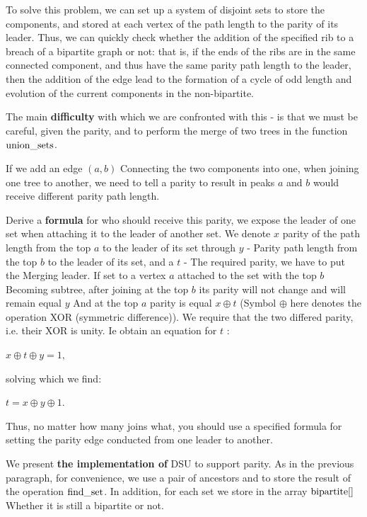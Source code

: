To solve this problem, we can set up a system of disjoint sets to store the components, and stored at each vertex of the path length to the parity of its leader. Thus, we can quickly check whether the addition of the specified rib to a breach of a bipartite graph or not: that is, if the ends of the ribs are in the same connected component, and thus have the same parity path length to the leader, then the addition of the edge lead to the formation of a cycle of odd length and evolution of the current components in the non-bipartite.

The main \textbf{difficulty} with which we are confronted with this - is that we must be careful, given the parity, and to perform the merge of two trees in the function $\rm union \_sets$.

If we add an edge $(a, b)$ Connecting the two components into one, when joining one tree to another, we need to tell a parity to result in peaks $a$ and $b$ would receive different parity path length.

Derive a \textbf{formula} for who should receive this parity, we expose the leader of one set when attaching it to the leader of another set. We denote $x$ parity of the path length from the top $a$ to the leader of its set through $y$ - Parity path length from the top $b$ to the leader of its set, and a $t$ - The required parity, we have to put the Merging leader. If set to a vertex $a$ attached to the set with the top $b$ Becoming subtree, after joining at the top $b$ its parity will not change and will remain equal $y$ And at the top $a$ parity is equal $x \oplus t$ (Symbol $\oplus$ here denotes the operation XOR (symmetric difference)). We require that the two differed parity, i.e. their XOR is unity. Ie obtain an equation for $t$ :

$x \oplus t \oplus y = 1,$

solving which we find:

$t = x \oplus y \oplus 1.$

Thus, no matter how many joins what, you should use a specified formula for setting the parity edge conducted from one leader to another.

We present \textbf{the implementation of} DSU to support parity. As in the previous paragraph, for convenience, we use a pair of ancestors and to store the result of the operation $\rm find \_set$. In addition, for each set we store in the array ${\rm bipartite} []$ Whether it is still a bipartite or not.

